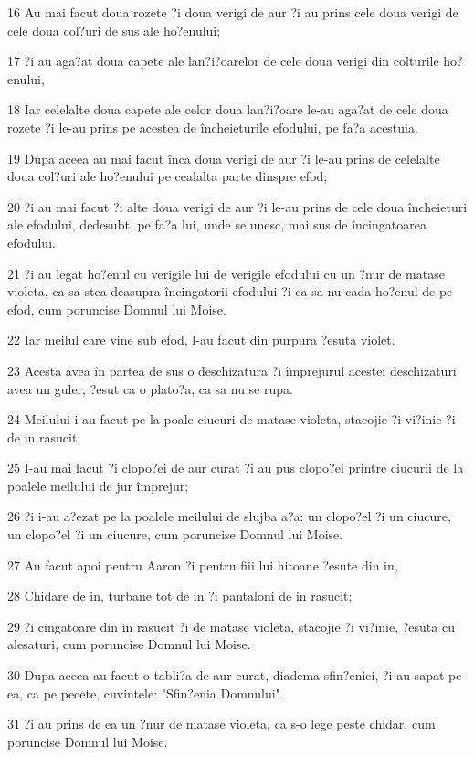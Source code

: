 \par 16 Au mai facut doua rozete ?i doua verigi de aur ?i au prins cele doua verigi de cele doua col?uri de sus ale ho?enului;
\par 17 ?i au aga?at doua capete ale lan?i?oarelor de cele doua verigi din colturile ho?enului,
\par 18 Iar celelalte doua capete ale celor doua lan?i?oare le-au aga?at de cele doua rozete ?i le-au prins pe acestea de încheieturile efodului, pe fa?a acestuia.
\par 19 Dupa aceea au mai facut înca doua verigi de aur ?i le-au prins de celelalte doua col?uri ale ho?enului pe cealalta parte dinspre efod;
\par 20 ?i au mai facut ?i alte doua verigi de aur ?i le-au prins de cele doua încheieturi ale efodului, dedesubt, pe fa?a lui, unde se unesc, mai sus de încingatoarea efodului.
\par 21 ?i au legat ho?enul cu verigile lui de verigile efodului cu un ?nur de matase violeta, ca sa stea deasupra încingatorii efodului ?i ca sa nu cada ho?enul de pe efod, cum poruncise Domnul lui Moise.
\par 22 Iar meilul care vine sub efod, l-au facut din purpura ?esuta violet.
\par 23 Acesta avea în partea de sus o deschizatura ?i împrejurul acestei deschizaturi avea un guler, ?esut ca o plato?a, ca sa nu se rupa.
\par 24 Meilului i-au facut pe la poale ciucuri de matase violeta, stacojie ?i vi?inie ?i de in rasucit;
\par 25 I-au mai facut ?i clopo?ei de aur curat ?i au pus clopo?ei printre ciucurii de la poalele meilului de jur împrejur;
\par 26 ?i i-au a?ezat pe la poalele meilului de slujba a?a: un clopo?el ?i un ciucure, un clopo?el ?i un ciucure, cum poruncise Domnul lui Moise.
\par 27 Au facut apoi pentru Aaron ?i pentru fiii lui hitoane ?esute din in,
\par 28 Chidare de in, turbane tot de in ?i pantaloni de in rasucit;
\par 29 ?i cingatoare din in rasucit ?i de matase violeta, stacojie ?i vi?inie, ?esuta cu alesaturi, cum poruncise Domnul lui Moise.
\par 30 Dupa aceea au facut o tabli?a de aur curat, diadema sfin?eniei, ?i au sapat pe ea, ca pe pecete, cuvintele: "Sfin?enia Domnului".
\par 31 ?i au prins de ea un ?nur de matase violeta, ca s-o lege peste chidar, cum poruncise Domnul lui Moise.
